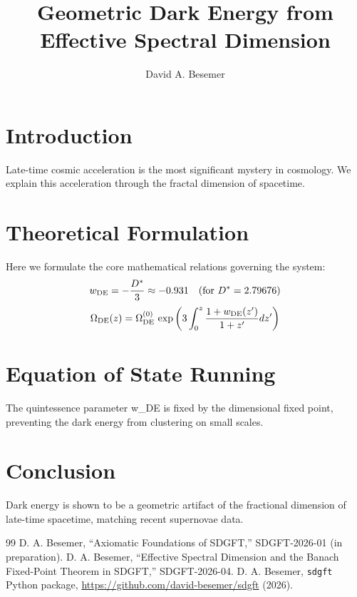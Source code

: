 \documentclass[a4paper,11pt]{article}
\begin{document}
\title{Geometric Dark Energy from Effective Spectral Dimension}

\author{David A. Besemer}



\maketitle

\section{Introduction}
Late-time cosmic acceleration is the most significant mystery in cosmology. We explain this acceleration through the fractal dimension of spacetime.

\section{Theoretical Formulation}
Here we formulate the core mathematical relations governing the system:
\begin{equation}
  w_{\mathrm{DE}} = -\frac{D^{*}}{3} \approx -0.931 \quad (\text{for } D^{*} = 2.79676)
\end{equation}
\begin{equation}
  \Omega_{\text{DE}}(z) = \Omega_{\text{DE}}^{(0)}\,\exp\left(3\int_0^z \frac{1+w_{\mathrm{DE}}(z')}{1+z'} dz'\right)
\end{equation}
\section{Equation of State Running}
The quintessence parameter w_DE is fixed by the dimensional fixed point, preventing the dark energy from clustering on small scales.

\section{Conclusion}
Dark energy is shown to be a geometric artifact of the fractional dimension of late-time spacetime, matching recent supernovae data.



\begin{thebibliography}{99}
 D. A. Besemer, ``Axiomatic Foundations of SDGFT,'' SDGFT-2026-01 (in preparation).
 D. A. Besemer, ``Effective Spectral Dimension and the Banach Fixed-Point Theorem in SDGFT,'' SDGFT-2026-04.
 D. A. Besemer, \texttt{sdgft} Python package, \url{https://github.com/david-besemer/sdgft} (2026).
\end{thebibliography}
\end{document}
